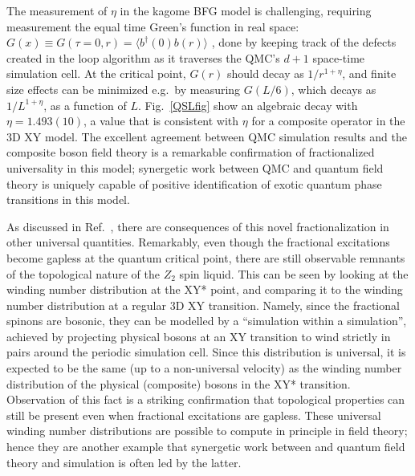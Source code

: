 \documentclass[range]{ar2e}
\begin{document}
The measurement of $\eta$ in the kagome BFG model is challenging, requiring measurement the equal time Green's function in real space: $G(x)\equiv G(\tau=0,r) = \langle b^\dagger(0) b(r) \rangle$ \cite{WormA,gfsse}, done by keeping track of the defects created in the loop algorithm \cite{Syljuasen02} as it traverses the QMC's $d+1$ space-time simulation cell.  At the critical point, $G(r)$ should decay as $1/r^{1+\eta}$, and finite size effects can be minimized e.g.~by measuring $G(L/6)$, which decays as $1/L^{1+\eta}$, as a function of $L$.  Fig.~\ref{QSLfig} show an algebraic decay with $\eta=1.493(10)$, a value that is consistent with $\eta$ for a composite operator in the 3D XY model.  The excellent agreement between QMC simulation results and the composite boson field theory is a remarkable confirmation of fractionalized universality in this model; synergetic work between QMC and quantum field theory is uniquely capable of positive identification of exotic quantum phase transitions in this model.

As discussed in Ref.~\cite{XYstarQMC}, there are consequences of this novel fractionalization in other universal quantities.  Remarkably, even though the fractional excitations become gapless at the quantum critical point, there are still observable remnants of the topological nature of the $Z_2$ spin liquid.  This can be seen by looking at the winding number distribution at the XY* point, and comparing it to the winding number distribution at a regular 3D XY transition.  Namely, since the fractional spinons are bosonic, they can be modelled by a ``simulation within a simulation'', achieved by projecting physical bosons at an XY transition to wind strictly in pairs around the periodic simulation cell.  Since this distribution is universal, it is expected to be the same (up to a non-universal velocity) as the winding number distribution of the physical (composite) bosons in the XY* transition.  Observation of this fact \cite{XYstarQMC} is a striking confirmation that topological properties can still be present even when fractional excitations are gapless.  These universal winding number distributions are possible to compute in principle in field theory; hence they are another example that synergetic work between and quantum field theory and simulation is often led by the latter.


\end{document}
